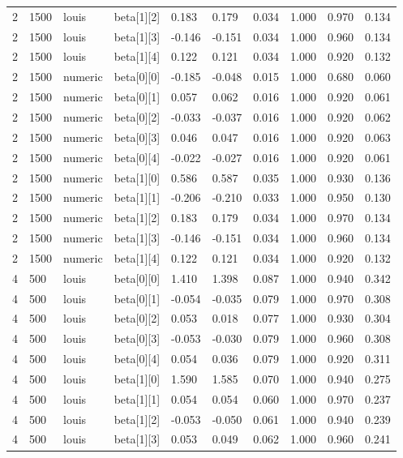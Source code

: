 \begin{table}
\begin{tabular}{llllllllll}
2 & 1500 & louis & beta[1][2] & 0.183 & 0.179 & 0.034 & 1.000 & 0.970 & 0.134 \\
2 & 1500 & louis & beta[1][3] & -0.146 & -0.151 & 0.034 & 1.000 & 0.960 & 0.134 \\
2 & 1500 & louis & beta[1][4] & 0.122 & 0.121 & 0.034 & 1.000 & 0.920 & 0.132 \\
2 & 1500 & numeric & beta[0][0] & -0.185 & -0.048 & 0.015 & 1.000 & 0.680 & 0.060 \\
2 & 1500 & numeric & beta[0][1] & 0.057 & 0.062 & 0.016 & 1.000 & 0.920 & 0.061 \\
2 & 1500 & numeric & beta[0][2] & -0.033 & -0.037 & 0.016 & 1.000 & 0.920 & 0.062 \\
2 & 1500 & numeric & beta[0][3] & 0.046 & 0.047 & 0.016 & 1.000 & 0.920 & 0.063 \\
2 & 1500 & numeric & beta[0][4] & -0.022 & -0.027 & 0.016 & 1.000 & 0.920 & 0.061 \\
2 & 1500 & numeric & beta[1][0] & 0.586 & 0.587 & 0.035 & 1.000 & 0.930 & 0.136 \\
2 & 1500 & numeric & beta[1][1] & -0.206 & -0.210 & 0.033 & 1.000 & 0.950 & 0.130 \\
2 & 1500 & numeric & beta[1][2] & 0.183 & 0.179 & 0.034 & 1.000 & 0.970 & 0.134 \\
2 & 1500 & numeric & beta[1][3] & -0.146 & -0.151 & 0.034 & 1.000 & 0.960 & 0.134 \\
2 & 1500 & numeric & beta[1][4] & 0.122 & 0.121 & 0.034 & 1.000 & 0.920 & 0.132 \\
4 & 500 & louis & beta[0][0] & 1.410 & 1.398 & 0.087 & 1.000 & 0.940 & 0.342 \\
4 & 500 & louis & beta[0][1] & -0.054 & -0.035 & 0.079 & 1.000 & 0.970 & 0.308 \\
4 & 500 & louis & beta[0][2] & 0.053 & 0.018 & 0.077 & 1.000 & 0.930 & 0.304 \\
4 & 500 & louis & beta[0][3] & -0.053 & -0.030 & 0.079 & 1.000 & 0.960 & 0.308 \\
4 & 500 & louis & beta[0][4] & 0.054 & 0.036 & 0.079 & 1.000 & 0.920 & 0.311 \\
4 & 500 & louis & beta[1][0] & 1.590 & 1.585 & 0.070 & 1.000 & 0.940 & 0.275 \\
4 & 500 & louis & beta[1][1] & 0.054 & 0.054 & 0.060 & 1.000 & 0.970 & 0.237 \\
4 & 500 & louis & beta[1][2] & -0.053 & -0.050 & 0.061 & 1.000 & 0.940 & 0.239 \\
4 & 500 & louis & beta[1][3] & 0.053 & 0.049 & 0.062 & 1.000 & 0.960 & 0.241 \\

\end{tabular}
\end{table}
